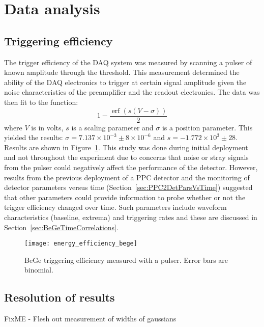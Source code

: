 	\section{Data analysis}
	\label{sec:BeGeDataAnalysis}
	
		\subsection{Triggering efficiency}
		\label{sec:BeGeTrigEff}

The trigger efficiency of the DAQ system was measured by scanning a pulser of known amplitude through the threshold.  This measurement determined the ability of the DAQ electronics to trigger at certain signal amplitude given the noise characteristics of the preamplifier and the readout electronics.  The data was then fit to the function:
			\[
			1 - \frac{\operatorname{erf} \left(s(V-\sigma)\right)}{2}
			\]
where $V$ is in volts, $s$ is a scaling parameter and $\sigma$ is a position parameter.  This yielded the results: $\sigma = 7.137\times10^{-3}\pm8\times10^{-6}$ and $s = -1.772\times10^{3}\pm28$.  Results are shown in Figure~\ref{fig:BeGeTriggeringEfficiency}.  This study was done during initial deployment and not throughout the experiment due to concerns that noise or stray signals from the pulser could negatively affect the performance of the detector.  However, results from the previous deployment of a PPC detector and the monitoring of detector parameters versus time (Section~\ref{sec:PPC2DetParsVsTime}) suggested that other parameters could provide information to probe whether or not the trigger efficiency changed over time.  Such parameters include waveform characteristics (baseline, extrema) and triggering rates and these are discussed in Section~\ref{sec:BeGeTimeCorrelations}.

			\begin{figure}
				\centering
				\texttt{[image: energy\_efficiency\_bege]}
				\caption[BeGe triggering efficiency measured with a pulser]
				{BeGe triggering efficiency measured with a pulser.  Error bars are binomial.}
				\label{fig:BeGeTriggeringEfficiency}
			\end{figure}

		\subsection{Resolution of results}

FixME - Flesh out measurement of widths of gaussians

